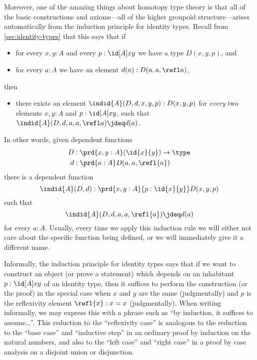 Moreover, one of the amazing things about homotopy type theory is that all of the basic constructions and axioms---all of the
higher groupoid structure---arises automatically from the induction
principle for identity types.
Recall from \cref{sec:identity-types} that this says that if
\begin{itemize}
\item for every $x,y:A$ and every $p:\id[A]xy$ we have a type $D(x,y,p)$, and
\item for every $a:A$ we have an element $d(a):D(a,a,\refl a)$,
\end{itemize}
then
\begin{itemize}
\item there exists an element $\indid{A}(D,d,x,y,p):D(x,y,p)$ for \emph{every} two elements $x,y:A$ and $p:\id[A]xy$, such that $\indid{A}(D,d,a,a,\refl a) \jdeq d(a)$.
\end{itemize}
In other words, given dependent functions
\begin{align*}
D & :\prd{x,y:A} (\id{x}{y}) \to \type\\
d & :\prd{a:A} D(a,a,\refl{a})
\end{align*}
there is a dependent function
\[\indid{A}(D,d):\prd{x,y:A}{p:\id{x}{y}} D(x,y,p)\]
such that
\begin{equation}\label{eq:Jconv}
\indid{A}(D,d,a,a,\refl{a})\jdeq d(a)
\end{equation}
for every $a:A$.
Usually, every time we apply this induction rule we will either not care about the specific function being defined, or we will immediately give it a different name.

Informally, the induction principle for identity types says that if we want to construct an object (or prove a statement) which depends on an inhabitant $p:\id[A]xy$ of an identity type, then it suffices to perform the construction (or the proof) in the special case when $x$ and $y$ are the same (judgmentally) and $p$ is the reflexivity element $\refl{x}:x=x$ (judgmentally).
When writing informally, we may express this with a phrase such as ``by induction, it suffices to assume\dots''.
This reduction to the ``reflexivity case'' is analogous to the reduction to the ``base case'' and ``inductive step'' in an ordinary proof by induction on the natural numbers, and also to the ``left case'' and ``right case'' in a proof by case analysis on a disjoint union or disjunction.%


